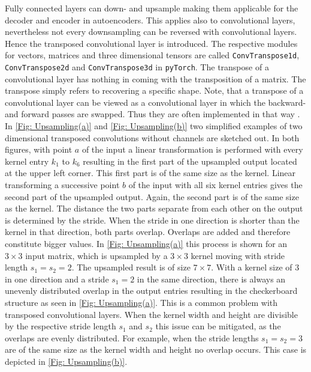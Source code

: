 Fully connected layers can down- and upsample making them applicable for the decoder and encoder in autoencoders. This applies also to convolutional layers, nevertheless not every downsampling can be reversed with convolutional layers. Hence the transposed convolutional layer is introduced. The respective modules for vectors, matrices and three dimensional tensors are called \texttt{ConvTranspose1d}, \texttt{ConvTranspose2d} and \texttt{ConvTranspose3d} in \texttt{pyTorch}. The transpose of a convolutional layer has nothing in coming with the transposition of a matrix. The transpose simply refers to recovering a specific shape. Note, that a transpose of a convolutional layer can be viewed as a convolutional layer in which the backward- and forward passes are swapped. Thus they are often implemented in that way \cite{Goodfellow} \cite{lane_2018} \cite{divyanshu_2020}. In \cref{Fig: Upsampling(a)} and \cref{Fig: Upsampling(b)} two simplified examples of two dimensional transposed convolutions without channels are sketched out. In both figures, with point $a$ of the input a linear transformation is performed with every kernel entry $k_1$ to $k_6$ resulting in the first part of the upsampled output located at the upper left corner. This first part is of the same size as the kernel. Linear transforming a successive point $b$ of the input with all six kernel entries gives the second part of the upsampled output. Again, the second part is of the same size as the kernel. The distance the two parts separate from each other on the output is determined by the stride. When the stride in one direction is shorter than the kernel in that direction, both parts overlap. Overlaps are added and therefore constitute bigger values. In \cref{Fig: Upsampling(a)} this process is shown for an $3 \times 3$ input matrix, which is upsampled by a $3\times 3$ kernel moving with stride length $s_1=s_2=2$. The upsampled result is of size $7 \times 7$. With a kernel size of 3 in one direction and a stride $s_1=2$ in the same direction, there is always an unevenly distributed overlap in the output entries resulting in the checkerboard structure as seen in \cref{Fig: Upsampling(a)}. This is a common problem with transposed convolutional layers. When the kernel width and height are divisible by the respective stride length $s_1$ and $s_2$ this issue can be mitigated, as the overlaps are evenly distributed. For example, when the stride lengths $s_1=s_2=3$ are of the same size as the kernel width and height no overlap occurs. This case is depicted in \cref{Fig: Upsampling(b)}.\\
